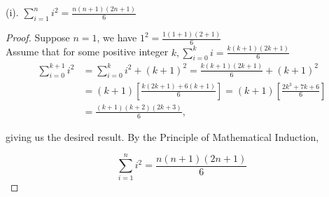 \documentclass[11pt]{amsart}
\begin{document}
(i). $\sum_{i=1}^{n} i^2 = \frac{n(n+1)(2n+1)}{6}$

\begin{proof}
	Suppose $n=1$, we have $1^2 = \frac{1(1+1)(2+1)}{6}$ \\

	Assume that for some positive integer $k, \sum_{i=0}^{k} i = \frac{k(k+1)(2k+1)}{6}$ \\

	\begin{align*}
		\sum_{i=0}^{k+1} i^2 &= \sum_{i=0}^{k} i^2 + (k+1)^2 = \frac{k(k+1)(2k+1)}{6} + (k+1)^2 \\
		&= (k+1)\left[\frac{k(2k+1)+6(k+1)}{6}\right] = (k+1)\left[\frac{2k^3 +7k + 6}{6}\right] \\
		&= \frac{(k+1)(k+2)(2k+3)}{6},
	\end{align*}

	giving us the desired result. By the Principle of Mathematical Induction,

	\[
		\sum_{i=1}^{n} i^2 = \frac{n(n+1)(2n+1)}{6}
	\]
\end{proof}
\end{document}
